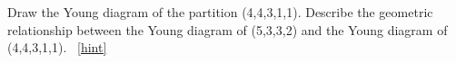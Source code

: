 \documentclass{book}
\begin{document}
\setcounter{project}{303}
\addtocounter{project}{-1}
\begin{activity}[]\label{activity-296}
\hypertarget{p-1551}{}%
Draw the Young diagram of the partition (4,4,3,1,1). Describe the geometric relationship between the Young diagram of (5,3,3,2) and the Young diagram of (4,4,3,1,1).%
~\hfill{\tiny\hyperlink{a-303}{[hint]}\hypertarget{q-303}{}}\end{activity}
\end{document}
